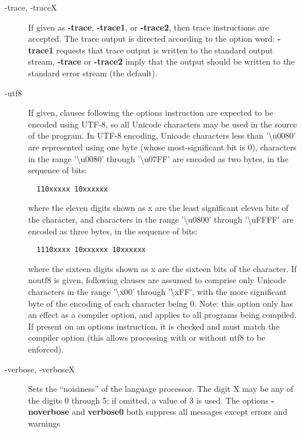 \begin{description}
\item[-trace, -traceX]
If given as \textbf{-trace}, \textbf{-trace1}, or \textbf{-trace2}, then trace instructions are accepted. The trace output is directed according to the option word: \textbf{-trace1} requests that trace output is written to the standard output stream, \textbf{-trace} or \textbf{-trace2} imply that the output should be written to the standard error stream (the default).
\item[-utf8]
If given, clauses following the options instruction are expected to be encoded using UTF-8, so all Unicode characters may be used in the source of the program.
In UTF-8 encoding, Unicode characters less than '\textbackslash u0080' are represented using one byte (whose most-significant bit is 0), characters in the range '\textbackslash u0080' through '\textbackslash u07FF' are encoded as two bytes, in the sequence of bits:
\begin{verbatim}
  110xxxxx 10xxxxxx
\end{verbatim}
where the eleven digits shown as x are the least significant eleven bits of the character, and characters in the range '\textbackslash u0800' through '\textbackslash uFFFF' are encoded as three bytes, in the sequence of bits:
\begin{verbatim}
  1110xxxx 10xxxxxx 10xxxxxx
\end{verbatim}
where the sixteen digits shown as x are the sixteen bits of the character.
If noutf8 is given, following clauses are assumed to comprise only Unicode characters in the range '\textbackslash x00' through '\textbackslash xFF', with the more significant byte of the encoding of each character being 0.
Note: this option only has an effect as a compiler option, and applies to all programs being compiled. If present on an options instruction, it is checked and must match the compiler option (this allows processing with or without utf8 to be enforced).
\item[-verbose, -verboseX]
Sets the “noisiness” of the language processor. The digit X may be any of the digits 0 through 5; if omitted, a value of 3 is used. The options \textbf{-noverbose} and \textbf{verbose0} both suppress all messages except errors and warnings
\end{description}

